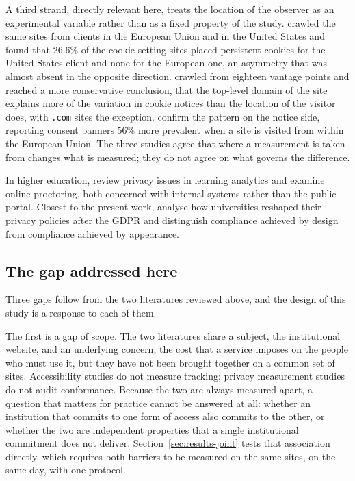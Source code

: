 \documentclass[pdflatex,sn-basic,Numbered,iicol]{sn-jnl}
\theoremstyle{thmstyleone}
\theoremstyle{thmstyletwo}
\theoremstyle{thmstylethree}
\begin{document}
	A third strand, directly relevant here, treats the location of the observer as an experimental variable rather than as a fixed property of the study. \citet{dabrowski2019measuring} crawled the same sites from clients in the European Union and in the United States and found that 26.6\% of the cookie-setting sites placed persistent cookies for the United States client and none for the European one, an asymmetry that was almost absent in the opposite direction. \citet{vaneijk2019impact} crawled from eighteen vantage points and reached a more conservative conclusion, that the top-level domain of the site explains more of the variation in cookie notices than the location of the visitor does, with \texttt{.com} sites the exception. \citet{rasaii2023exploring} confirm the pattern on the notice side, reporting consent banners 56\% more prevalent when a site is visited from within the European Union. The three studies agree that where a measurement is taken from changes what is measured; they do not agree on what governs the difference.
	
	In higher education, \citet{liu2023understanding} review privacy issues in learning analytics and \citet{mutimukwe2026privacy} examine online proctoring, both concerned with internal systems rather than the public portal. Closest to the present work, \citet{munot2025compliance} analyse how universities reshaped their privacy policies after the GDPR and distinguish compliance achieved by design from compliance achieved by appearance.
	
	\subsection{The gap addressed here}\label{sec:related-gap}
	
	Three gaps follow from the two literatures reviewed above, and the design of this study is a response to each of them.
	
	The first is a gap of scope. The two literatures share a subject, the institutional website, and an underlying concern, the cost that a service imposes on the people who must use it, but they have not been brought together on a common set of sites. Accessibility studies do not measure tracking; privacy measurement studies do not audit conformance. Because the two are always measured apart, a question that matters for practice cannot be answered at all: whether an institution that commits to one form of access also commits to the other, or whether the two are independent properties that a single institutional commitment does not deliver. Section~\ref{sec:results-joint} tests that association directly, which requires both barriers to be measured on the same sites, on the same day, with one protocol.
	
\end{document}
